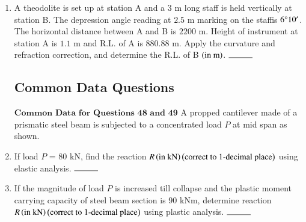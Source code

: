\documentclass[journal,onecolumn]{IEEEtran}
\theoremstyle{remark}
\begin{document}
\begin{enumerate}
    \item A theodolite is set up at station A and a $3$ m long staff is held vertically at station B. The depression
angle reading at $2.5$ m marking on the staffis $6\degree 10^{\prime}$. The horizontal distance between A and B is
$2200$ m. Height of instrument at station A is $1.1$ m and R.L. of A is $880.88$ m. Apply the curvature
and refraction correction, and determine the R.L. of B $\left(\text{in m}\right)$. $\rule{1cm}{0.15mm}$ 

	\subsection{Common Data Questions} \label{cdq:48-49}
	$\textbf{Common Data for Questions 48 and 49}$
	\newline
    A propped cantilever made of a prismatic steel beam is subjected to a concentrated load $P$ at mid span as shown.
	\begin{center}
	\end{center}

	\item If load $P$ = $80$ kN, find the reaction $R \left(\text{in kN}\right) \left(\text{correct to } 1 \text{-decimal place}\right)$ using elastic analysis. $\rule{1cm}{0.15mm}$ 

	\item If the magnitude of load $P$ is increased till collapse and the plastic moment carrying capacity of steel beam section is $90$ kNm, determine reaction $R \left(\text{in kN}\right) \left(\text{correct to } 1 \text{-decimal place}\right)$ using plastic analysis. $\rule{1cm}{0.15mm}$ 


\end{enumerate}
\end{document}

